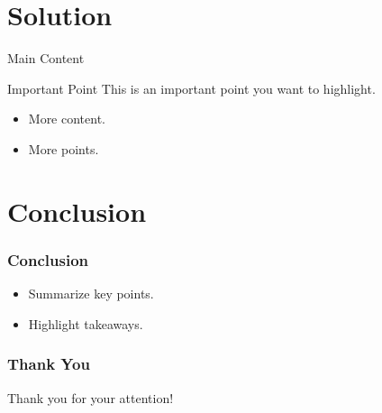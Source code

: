 \documentclass{beamer}
\begin{document}
\section{Solution}

\begin{frame}[t]{Main Content}
    \begin{block}{Important Point}
        This is an important point you want to highlight.
    \end{block}
    \begin{itemize}
        \item More content.
        \item More points.
    \end{itemize}
\end{frame}

\section{Conclusion}

\begin{frame}
    \frametitle{Conclusion}
    \begin{itemize}
        \item Summarize key points.
        \item Highlight takeaways.
    \end{itemize}
\end{frame}


\begin{frame}
    \frametitle{Thank You}
    \centering
    \Huge Thank you for your attention!
\end{frame}
\end{document}
